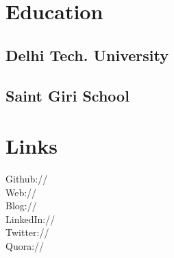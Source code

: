 \documentclass[]{deedy-resume-openfont}
\begin{document}
%
%
\lastupdated

%
%



%
%

\begin{minipage}[t]{0.33\textwidth} 


\section{Education} 

\subsection{Delhi Tech. University}
\sectionsep



\subsection{Saint Giri School}
\sectionsep


\section{Links} 
Github:// \href{https://github.com/aktech}{} \\
Web:// \href{http://iamit.in/}{} \\
Blog:// \href{http://iamit.in/blog/}{} \\
LinkedIn://  \href{https://www.linkedin.com/in/iaktech}{} \\
Twitter://  \href{https://twitter.com/iaktech}{} \\
Quora://  \href{https://www.quora.com/Amit-Kumar-516}{}
\sectionsep


\end{minipage}
\end{document}

